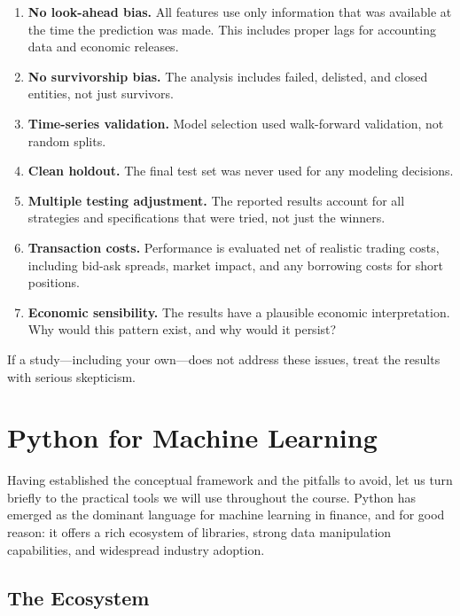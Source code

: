 \documentclass[11pt,a4paper]{article}
\begin{document}
\begin{enumerate}
    \item[$\checkmark$] \textbf{No look-ahead bias.} All features use only information that was available at the time the prediction was made. This includes proper lags for accounting data and economic releases.
    \item[$\checkmark$] \textbf{No survivorship bias.} The analysis includes failed, delisted, and closed entities, not just survivors.
    \item[$\checkmark$] \textbf{Time-series validation.} Model selection used walk-forward validation, not random splits.
    \item[$\checkmark$] \textbf{Clean holdout.} The final test set was never used for any modeling decisions.
    \item[$\checkmark$] \textbf{Multiple testing adjustment.} The reported results account for all strategies and specifications that were tried, not just the winners.
    \item[$\checkmark$] \textbf{Transaction costs.} Performance is evaluated net of realistic trading costs, including bid-ask spreads, market impact, and any borrowing costs for short positions.
    \item[$\checkmark$] \textbf{Economic sensibility.} The results have a plausible economic interpretation. Why would this pattern exist, and why would it persist?
\end{enumerate}

If a study---including your own---does not address these issues, treat the results with serious skepticism.

\section{Python for Machine Learning}

Having established the conceptual framework and the pitfalls to avoid, let us turn briefly to the practical tools we will use throughout the course. Python has emerged as the dominant language for machine learning in finance, and for good reason: it offers a rich ecosystem of libraries, strong data manipulation capabilities, and widespread industry adoption.

\subsection{The Ecosystem}
\end{document}
